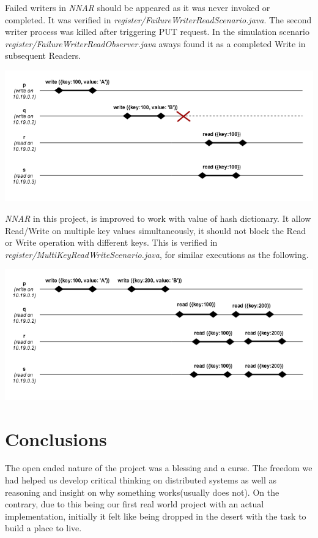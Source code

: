 \documentclass[a4paper, 11pt]{article}
\begin{document}
Failed writers in \textit{NNAR} should be appeared as it was never invoked or completed. It was verified in \textit{register/FailureWriterReadScenario.java}. The second writer process was killed after triggering PUT request. In the simulation scenario \textit{register/FailureWriterReadObserver.java} aways found it as a completed Write in subsequent Readers.


{\centering\includegraphics[scale = 0.5]{./images/failed_writer.png}\par}

\textit{NNAR} in this project, is improved to work with value of hash dictionary. It allow Read/Write on multiple key values simultaneously, it should not block the Read or Write operation with different keys. This is verified in \textit{register/MultiKeyReadWriteScenario.java}, for similar executions as the following.

{\centering\includegraphics[scale = 0.5]{./images/mkey_writes.png}\par}


\section{Conclusions}

The open ended nature of the project was a blessing and a curse. The freedom we had helped us develop critical thinking on distributed systems as well as reasoning and insight on why something works(usually does not). On the contrary, due to  this being our first real world project with an actual implementation, initially it felt like being dropped in the desert with the task to build a place to live. \par
\end{document}
